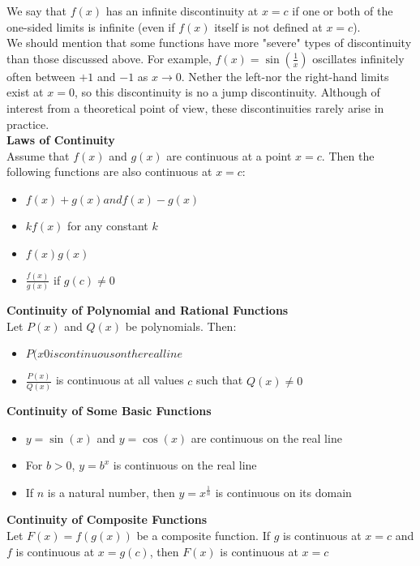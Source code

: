 \documentclass{article}
\begin{document}
	We say that $f(x)$ has an infinite discontinuity at $x = c$ if one or both of the one-sided limits is infinite (even if $f(x)$ itself is not defined at $x = c$).\\

	We should mention that some functions have more "severe" types of discontinuity than those discussed above. For example, $f(x) = \sin(\frac{1}{x})$ oscillates infinitely often between $+1$ and $-1$ as $x \to 0$. Nether the left-nor the right-hand limits exist at $x = 0$, so this discontinuity is no a jump discontinuity. Although of interest from a theoretical point of view, these discontinuities rarely arise in practice.\\

	\textbf{Laws of Continuity}\\
	Assume that $f(x)$ and $g(x)$ are continuous at a point $x = c$. Then the following functions are also continuous at $x = c$:\\
		\begin{itemize}
			\item $f(x) + g(x) and f(x) - g(x)$
			\item $kf(x)$ for any constant $k$
			\item $f(x)g(x)$
			\item $\frac{f(x)}{g(x)}$ if $g(c) \neq 0$
		\end{itemize}

	\textbf{Continuity of Polynomial and Rational Functions}\\
	Let $P(x)$ and $Q(x)$ be polynomials. Then:\\
		\begin{itemize}
			\item $P(x0 is continuous on the real line$
			\item $\frac{P(x)}{Q(x)}$ is continuous at all values $c$ such that $Q(x) \neq 0$
		\end{itemize}

	\textbf{Continuity of Some Basic Functions}\\
		\begin{itemize}
			\item $y = \sin(x)$ and $y = \cos(x)$ are continuous on the real line
			\item For $b > 0$, $y = b^x$ is continuous on the real line
			\item If $n$ is a natural number, then $y = x^{\frac{1}{n}}$ is continuous on its domain
		\end{itemize}

	\textbf{Continuity of Composite Functions}\\
		Let $F(x) = f(g(x))$ be a composite function. If $g$ is continuous at $x = c$ and $f$ is continuous at $x = g(c)$, then $F(x)$ is continuous at $x = c$\\	
\end{document}
